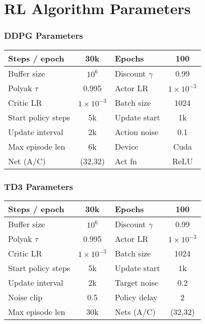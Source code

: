 \section{RL Algorithm Parameters}

\begin{frame}
  \frametitle{DDPG Parameters}
  \scriptsize
  \begin{tabular}{|l|c||l|c|}
  \hline
  Steps / epoch & 30k & Epochs & 100 \\ \hline
  Buffer size & $10^{6}$ & Discount $\gamma$ & 0.99 \\ \hline
  Polyak $\tau$ & 0.995 & Actor LR & $1\!\times\!10^{-3}$ \\ \hline
  Critic LR & $1\!\times\!10^{-3}$ & Batch size & 1024 \\ \hline
  Start policy steps & 5k & Update start & 1k \\ \hline
  Update interval & 2k & Action noise & 0.1 \\ \hline
  Max episode len & 6k & Device & Cuda \\ \hline
  Net (A/C) & (32,32) & Act fn & ReLU \\ \hline
  \end{tabular}
\end{frame}

\begin{frame}
  \frametitle{TD3 Parameters}
  \scriptsize
  \begin{tabular}{|l|c||l|c|}
  \hline
  Steps / epoch & 30k & Epochs & 100 \\ \hline
  Buffer size & $10^{6}$ & Discount $\gamma$ & 0.99 \\ \hline
  Polyak $\tau$ & 0.995 & Actor LR & $1\!\times\!10^{-3}$ \\ \hline
  Critic LR & $1\!\times\!10^{-3}$ & Batch size & 1024 \\ \hline
  Start policy steps & 5k & Update start & 1k \\ \hline
  Update interval & 2k & Target noise & 0.2 \\ \hline
  Noise clip & 0.5 & Policy delay & 2 \\ \hline
  Max episode len & 30k & Nets (A/C) & (32,32) \\ \hline
  \end{tabular}
\end{frame}

